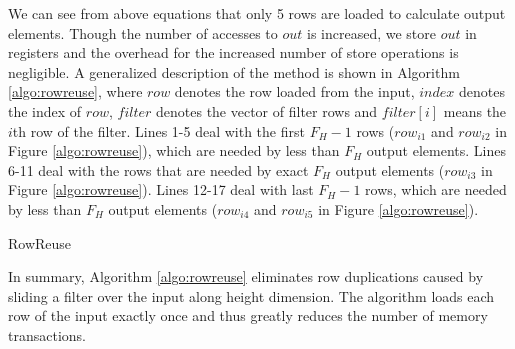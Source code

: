 We can see from above equations that only 5 rows are loaded to calculate output elements. {\color{red}Though the number of accesses to $out$ is increased, we store $out$ in registers and the overhead for the increased number of store operations is negligible.} A generalized description of the method is
shown in Algorithm \ref{algo:rowreuse}, where $row$ denotes the row loaded from the input, $index$ denotes the index of $row$, $filter$ denotes
the vector of filter rows and $filter[i]$ means the $i$th row of the filter. Lines 1-5 deal with the first $F_H-1$ rows ($row_{i1}$ and $row_{i2}$ in Figure \ref{algo:rowreuse}), which
are needed by less than $F_H$ output elements. Lines 6-11 deal with the rows that are needed by exact $F_H$ output elements ($row_{i3}$ in
Figure \ref{algo:rowreuse}). Lines 12-17 deal with last $F_H-1$ rows, which are needed by less than $F_H$ output elements ($row_{i4}$
and $row_{i5}$ in Figure \ref{algo:rowreuse}).

\begin{algorithm}
	\caption{RowReuse}
	\label{algo:rowreuse}
\end{algorithm}

In summary, Algorithm \ref{algo:rowreuse} eliminates row duplications caused by sliding a filter over the input along height dimension. The
algorithm loads each row of the input exactly once and thus greatly reduces the number of memory transactions.
